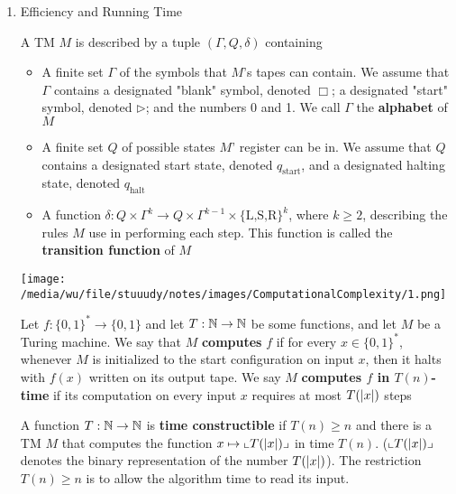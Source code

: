 \documentclass[11pt]{article}
\def \start {\text{start}}
\def \halt {\text{halt}}
\begin{document}
\begin{enumerate}
\item Efficiency and Running Time
\label{sec:org2ae97ba}
\begin{definition}[]
A TM \(M\) is described by a tuple \((\Gamma,Q,\delta)\) containing
\begin{itemize}
\item A finite set \(\Gamma\) of the symbols that \(M\)'s tapes can contain. We assume that \(\Gamma\) contains a
designated "blank" symbol, denoted \(\Box\); a designated "start" symbol, denoted \(\rhd\);
and the numbers 0 and 1. We call \(\Gamma\) the \textbf{alphabet} of \(M\)
\item A finite set \(Q\) of possible states \(M\)' register can be in. We assume that \(Q\) contains
a designated start state, denoted \(q_{\start}\), and a designated halting state, denoted \(q_{\halt}\)
\item A function \(\delta:Q\times\Gamma^k\to Q\times\Gamma^{k-1}\times\{\text{L,S,R}\}^k\),
where \(k\ge2\), describing the rules \(M\) use in performing each step. This function is
called the \textbf{transition function} of \(M\)
\end{itemize}
\end{definition}

\begin{center}
\texttt{[image: /media/wu/file/stuuudy/notes/images/ComputationalComplexity/1.png]}
\end{center}


\begin{definition}
Let \(f:\{0,1\}^*\to\{0,1\}\) and let \(T:\mathbb{N}\to\mathbb{N}\) be some functions, and let \(M\) be a Turing
machine. We say that \(M\) \textbf{computes} \(f\) if for every \(x\in\{0,1\}^*\), whenever \(M\) is
initialized to the start configuration on input \(x\), then it halts with \(f(x)\) written on
its output tape. We say \(M\) \textbf{computes \(f\) in \(T(n)\)-time} if its computation on every
input \(x\) requires at most \(T(\abs{x})\) steps
\end{definition}

A function \(T:\mathbb{N}\to\mathbb{N}\) is \textbf{time constructible} if \(T(n)\ge n\) and there is a TM \(M\) that
computes the function \(x\mapsto\lcorner{T(\abs{x})}\) in time \(T(n)\). (\(\lcorner{T(\abs{x})}\)
denotes the binary representation of the number \(T(\abs{x})\)). The restriction \(T(n)\ge n\) is
to allow the algorithm time to read its input.


\end{enumerate}
\end{document}
